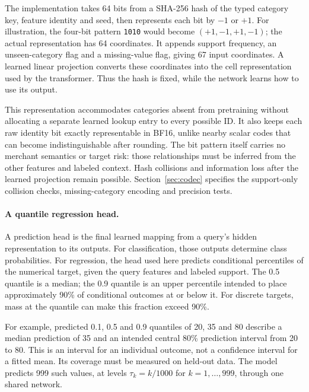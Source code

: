\documentclass[11pt]{article}
\begin{document}
The implementation takes 64 bits from a SHA-256 hash of the typed category key, feature identity and seed, then represents each bit by $-1$ or $+1$. For illustration, the four-bit pattern \texttt{1010} would become $(+1,-1,+1,-1)$; the actual representation has 64 coordinates. It appends support frequency, an unseen-category flag and a missing-value flag, giving 67 input coordinates. A learned linear projection converts these coordinates into the cell representation used by the transformer. Thus the hash is fixed, while the network learns how to use its output.

This representation accommodates categories absent from pretraining without allocating a separate learned lookup entry to every possible ID. It also keeps each raw identity bit exactly representable in BF16, unlike nearby scalar codes that can become indistinguishable after rounding. The bit pattern itself carries no merchant semantics or target risk: those relationships must be inferred from the other features and labeled context. Hash collisions and information loss after the learned projection remain possible. Section~\ref{sec:codec} specifies the support-only collision checks, missing-category encoding and precision tests.

\paragraph{A quantile regression head.}
A prediction head is the final learned mapping from a query's hidden representation to its outputs. For classification, those outputs determine class probabilities. For regression, the head used here predicts conditional percentiles of the numerical target, given the query features and labeled support. The 0.5 quantile is a median; the 0.9 quantile is an upper percentile intended to place approximately 90\% of conditional outcomes at or below it. For discrete targets, mass at the quantile can make this fraction exceed 90\%.

For example, predicted 0.1, 0.5 and 0.9 quantiles of 20, 35 and 80 describe a median prediction of 35 and an intended central 80\% prediction interval from 20 to 80. This is an interval for an individual outcome, not a confidence interval for a fitted mean. Its coverage must be measured on held-out data. The model predicts 999 such values, at levels $\tau_k=k/1000$ for $k=1,\ldots,999$, through one shared network.
\end{document}
